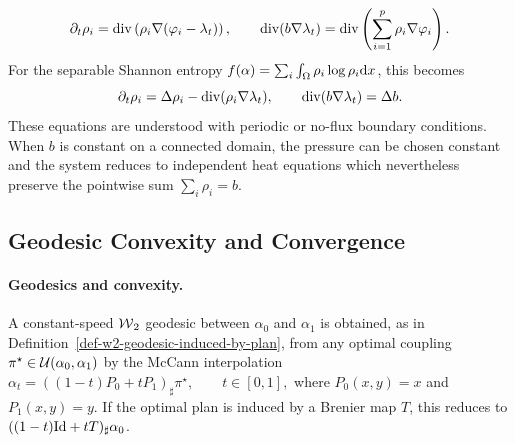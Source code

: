 \begin{equation}\label{eq-multispecies-constrained-pde}
\partial_t\rho_i=\operatorname{div}\left(\rho_i\nabla(\varphi_i-\lambda_t)\right),
\qquad
\operatorname{div}(b\nabla\lambda_t)=\operatorname{div}\left(\sum_{i=1}^p \rho_i\nabla\varphi_i\right).
\end{equation}
For the separable Shannon entropy $f(\alpha)=\sum_i\int_\Omega \rho_i\log\rho_i\mathrm{d} x$, this becomes
\begin{equation}\label{eq-multispecies-modified-heat}
\partial_t\rho_i=\Delta\rho_i-\operatorname{div}(\rho_i\nabla\lambda_t),
\qquad
\operatorname{div}(b\nabla\lambda_t)=\Delta b.
\end{equation}
These equations are understood with periodic or no-flux boundary conditions. When $b$ is constant on a connected domain, the pressure can be chosen constant and the system reduces to independent heat equations which nevertheless preserve the pointwise sum $\sum_i\rho_i=b$.

\subsection{Geodesic Convexity and Convergence}
\label{sec-geodesic-convexity}
\paragraph{Geodesics and convexity.}
A constant-speed $\operatorname{\mathcal{W}}_2$ geodesic between $\alpha_0$ and $\alpha_1$ is obtained, as in Definition~\ref{def-w2-geodesic-induced-by-plan}, from any optimal coupling $\pi^\star\in\mathcal{U}(\alpha_0,\alpha_1)$ by the McCann interpolation
\(\alpha_t=((1-t)P_0+tP_1)_\sharp\pi^\star, \qquad t\in[0,1],\)
where $P_0(x,y)=x$ and $P_1(x,y)=y$. If the optimal plan is induced by a Brenier map $T$, this reduces to $((1-t)\mathrm{Id}+tT)_\sharp\alpha_0$.

